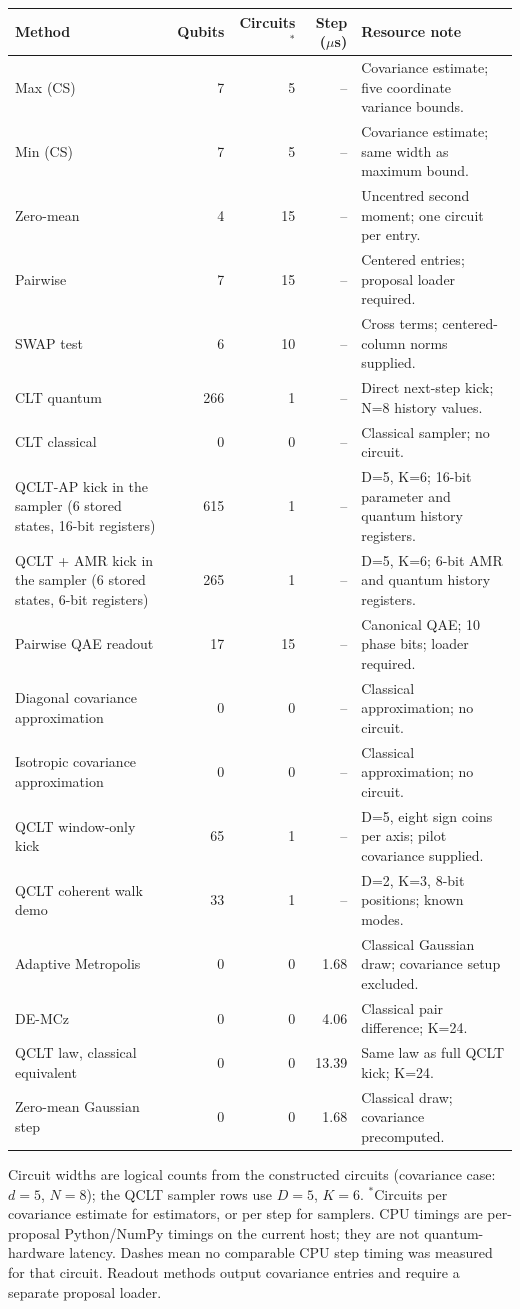 \footnotesize
\setlength{\tabcolsep}{2pt}
\begin{tabular}{@{}p{2.7cm}rrrp{4.6cm}@{}}
\toprule
Method & Qubits & Circuits$^*$ & Step ($\mu$s) & Resource note \\
\midrule
Max (CS) & 7 & 5 & -- & Covariance estimate; five coordinate variance bounds. \\
Min (CS) & 7 & 5 & -- & Covariance estimate; same width as maximum bound. \\
Zero-mean & 4 & 15 & -- & Uncentred second moment; one circuit per entry. \\
Pairwise & 7 & 15 & -- & Centered entries; proposal loader required. \\
SWAP test & 6 & 10 & -- & Cross terms; centered-column norms supplied. \\
CLT quantum & 266 & 1 & -- & Direct next-step kick; N=8 history values. \\
CLT classical & 0 & 0 & -- & Classical sampler; no circuit. \\
QCLT-AP kick in the sampler (6 stored states, 16-bit registers) & 615 & 1 & -- & D=5, K=6; 16-bit parameter and quantum history registers. \\
QCLT + AMR kick in the sampler (6 stored states, 6-bit registers) & 265 & 1 & -- & D=5, K=6; 6-bit AMR and quantum history registers. \\
Pairwise QAE readout & 17 & 15 & -- & Canonical QAE; 10 phase bits; loader required. \\
Diagonal covariance approximation & 0 & 0 & -- & Classical approximation; no circuit. \\
Isotropic covariance approximation & 0 & 0 & -- & Classical approximation; no circuit. \\
QCLT window-only kick & 65 & 1 & -- & D=5, eight sign coins per axis; pilot covariance supplied. \\
QCLT coherent walk demo & 33 & 1 & -- & D=2, K=3, 8-bit positions; known modes. \\
Adaptive Metropolis & 0 & 0 & 1.68 & Classical Gaussian draw; covariance setup excluded. \\
DE-MCz & 0 & 0 & 4.06 & Classical pair difference; K=24. \\
QCLT law, classical equivalent & 0 & 0 & 13.39 & Same law as full QCLT kick; K=24. \\
Zero-mean Gaussian step & 0 & 0 & 1.68 & Classical draw; covariance precomputed. \\
\bottomrule
\end{tabular}
\par\smallskip
\footnotesize Circuit widths are logical counts from the constructed circuits (covariance case: $d=5$, $N=8$); the QCLT sampler rows use $D=5$, $K=6$. $^*$Circuits per covariance estimate for estimators, or per step for samplers. CPU timings are per-proposal Python/NumPy timings on the current host; they are not quantum-hardware latency. Dashes mean no comparable CPU step timing was measured for that circuit. Readout methods output covariance entries and require a separate proposal loader.\par
